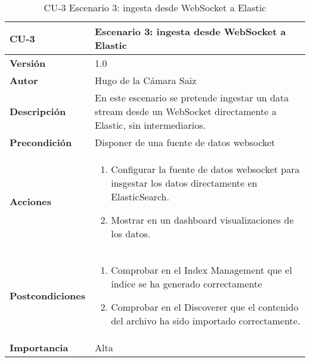 \begin{table}[p]
	\centering
	\begin{tabularx}{\linewidth}{ p{} p{} }
		\toprule
		\textbf{CU-3}    & \textbf{Escenario 3: ingesta desde WebSocket a Elastic}\\
		\toprule
		\textbf{Versión}              & 1.0    \\
		\textbf{Autor}                & Hugo de la Cámara Saiz \\
		\textbf{Descripción}          & En este escenario se pretende ingestar un data stream desde un WebSocket directamente a Elastic, sin intermediarios. \\
		\textbf{Precondición}         & Disponer de una fuente de datos websocket  \\
		\textbf{Acciones}             &
		\begin{enumerate}
			\def\labelenumi{\arabic{enumi}.}
			\tightlist
			\item Configurar la fuente de datos websocket para insgestar los datos directamente en ElasticSearch.
                \item Mostrar en un dashboard visualizaciones de los datos.
		\end{enumerate}\\
             \textbf{Postcondiciones}             &
		\begin{enumerate}
			\def\labelenumi{\arabic{enumi}.}
			\tightlist
			\item Comprobar en el Index Management que el índice se ha generado correctamente
			\item Comprobar en el Discoverer que el contenido del archivo ha sido importado correctamente.
		\end{enumerate}\\
		\textbf{Importancia}          & Alta \\
		\bottomrule
	\end{tabularx}
	\caption{CU-3 Escenario 3: ingesta desde WebSocket a Elastic}
\end{table}

